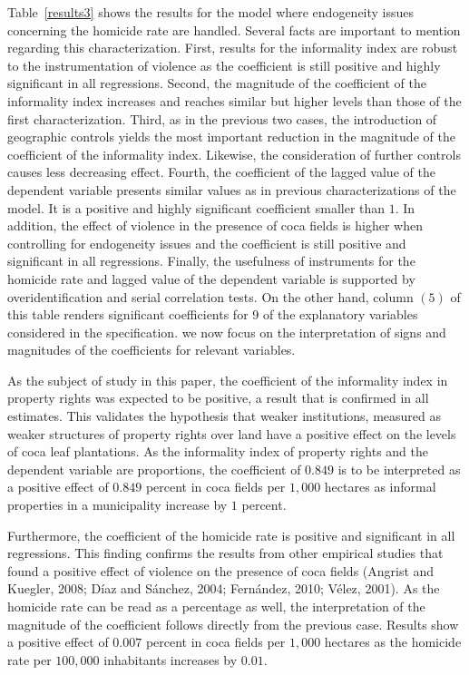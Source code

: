 \documentclass[12pt,a4paper,english]{article}%
\begin{document}
Table~\ref{results3} shows the results for the model where endogeneity issues concerning the homicide rate are handled. Several facts are important to mention regarding this characterization. First, results for the informality index are robust to the instrumentation of violence as the coefficient is still positive and highly significant in all regressions. Second, the magnitude of the coefficient of the informality index increases and reaches similar but higher levels than those of the first characterization. Third, as in the previous two cases, the introduction of geographic controls yields the most important reduction in the magnitude of the coefficient of the informality index. Likewise, the consideration of further controls causes less decreasing effect. Fourth, the coefficient of the lagged value of the dependent variable presents similar values as in previous characterizations of the model. It is a positive and highly significant coefficient smaller than $1$. In addition, the effect of violence in the presence of coca fields is higher when controlling for endogeneity issues and the coefficient is still positive and significant in all regressions. Finally, the usefulness of instruments for the homicide rate and lagged value of the dependent variable is supported by overidentification and serial correlation tests. On the other hand, column $(5)$ of this table renders significant coefficients for 9 of the explanatory variables considered in the specification. we now focus on the interpretation of signs and magnitudes of the coefficients for relevant variables.

As the subject of study in this paper, the coefficient of the informality index in property rights was expected to be positive, a result that is confirmed in all estimates. This validates the hypothesis that weaker institutions, measured as weaker structures of property rights over land have a positive effect on the levels of coca leaf plantations. As the informality index of property rights and the dependent variable are proportions, the coefficient of $0.849$ is to be interpreted as a positive effect of $0.849$ percent in coca fields per $1,000$ hectares as informal properties in a municipality increase by $1$ percent. 

Furthermore, the coefficient of the homicide rate is positive and significant in all regressions. This finding confirms the results from other empirical studies that found a positive effect of violence on the presence of coca fields (Angrist and Kuegler, 2008; D\'{i}az and S\'{a}nchez, 2004; Fern\'{a}ndez, 2010; V\'{e}lez, 2001). As the homicide rate can be read as a percentage as well, the interpretation of the magnitude of the coefficient follows directly from the previous case. Results show a positive effect of $0.007$ percent in coca fields per $1,000$ hectares as the homicide rate per $100,000$ inhabitants increases by $0.01$. 
\end{document}
